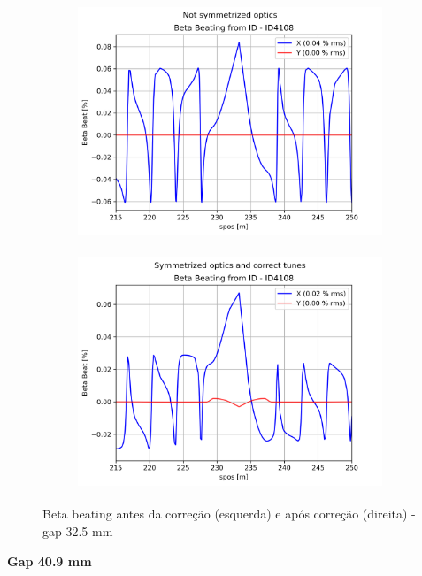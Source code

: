 \documentclass[a4paper,12pt]{article}
\begin{document}
\begin{figure}[H]
\begin{subfigure}{0.5\textwidth}
\includegraphics[width=0.9\linewidth, height=7cm]{figs/phase-25 gap32 uncorrected-optics.png} 
\label{fig:subim1-2532}
\end{subfigure}
\begin{subfigure}{0.5\textwidth}
\includegraphics[width=0.9\linewidth, height=7cm]{figs/phase-25 gap32 corrected-optics-tunes.png}
\label{fig:subim2-2532}
\end{subfigure}
\caption{Beta beating antes da correção (esquerda) e após correção (direita) - gap 32.5 mm}
\label{fig:bb-25_32}
\end{figure}

\textbf{Gap 40.9 mm} \\
\end{document}
